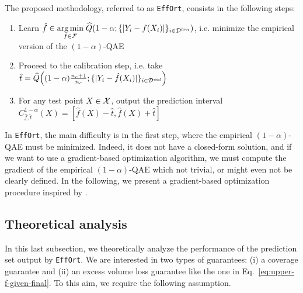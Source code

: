 The proposed methodology, referred to as \texttt{EffOrt}, consists in the following steps:
\begin{enumerate}
    \item Learn $\hat{f} \in \underset{f\in\mathcal{F}}{\operatorname*{arg\,min}}  \; \widehat{Q}(1-\alpha;\{|Y_i-f(X_i)|\}_{i\in{\cal D}^{lrn}})$, i.e. minimize the empirical version of the $(1-\alpha)$-QAE
    \item Proceed to the calibration step, i.e. take $\hat{t} = \widehat{Q}\Big((1-\alpha)\frac{n_c+1}{n_c};\{|Y_i-\hat{f}(X_i)|\}_{i\in{\cal D}^{cal}}\Big)$
    \item For any test point $X\in{\cal X}$, output the prediction interval $C_{\hat{f},\hat{t}}^{1-\alpha}(X) = [\hat{f}(X)-\hat{t},\hat{f}(X)+\hat{t}]$
\end{enumerate}
%
In \texttt{EffOrt}, the main difficulty is in the first step, where the empirical $(1-\alpha)$-QAE must be minimized. Indeed, it does not have a closed-form solution, and if we want to use a gradient-based optimization algorithm, we must compute the gradient of the empirical $(1-\alpha)$-QAE which not trivial, or might even not be clearly defined. In the following, we present a gradient-based optimization procedure inspired by \citet{pena2020solving}.


%



\subsection{Theoretical analysis}

In this last subsection, we theoretically analyze the performance of the prediction set output by \texttt{EffOrt}. We are interested in two types of guarantees: (i) a coverage guarantee and (ii) an excess volume loss guarantee like the one in Eq.~\eqref{eq:upper-f-given-final}. To this aim, we require the following assumption.

